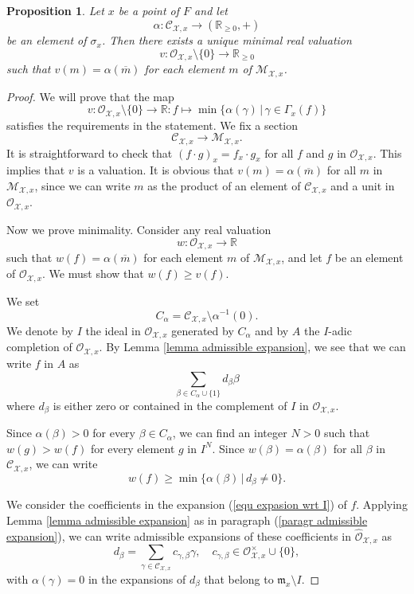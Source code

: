 \documentclass{amsart}%
\numberwithin{equation}{subsection}
\theoremstyle{plain2}
\newtheorem{prop}[equation]{Proposition}
\theoremstyle{definition2}
\theoremstyle{stepstyle}
\theoremstyle{point}
\theoremstyle{subpoint}
\newcommand{\R}{\ensuremath{\mathbb{R}}}
\newcommand{\cX}{\ensuremath{\mathscr{X}}}
\newcommand{\caC}{\ensuremath{\mathcal{C}}}
\newcommand{\caO}{\ensuremath{\mathcal{O}}}
\renewcommand{\R}{\ensuremath{\mathbb{R}}}
\begin{document}
\begin{prop}\label{prop-val}
Let $x$ be a point of $F$ and let
$$\alpha:\mathcal{C}_{\cX,x}\to (\R_{\geq 0},+)$$ be an element of $\sigma_x$.
 Then there exists a unique minimal real valuation
 $$v:\mathcal{O}_{\cX,x} \setminus \{0\}\to \R_{\geq 0}$$ such that
  $v(m)=\alpha(\overline{m})$ for each element $m$ of
 $\mathcal{M}_{\cX,x}$.
 \end{prop}
 \begin{proof}
 We will prove that the map
\begin{equation}\label{eq:val}
v:\mathcal{O}_{\cX,x} \setminus \{0\}\to \R:f\mapsto
\min\{\alpha(\gamma)\,|\,\gamma\in \Gamma_x(f)\}\end{equation}
satisfies the requirements in the statement.
 We fix a section
 $$\mathcal{C}_{\cX,x}\to \mathcal{M}_{\cX,x}.$$
 It is straightforward to
 check that $(f\cdot g)_x=f_x\cdot g_x$ for all $f$ and $g$ in
 $\mathcal{O}_{\cX,x}$.
 This implies that $v$ is a valuation. It is obvious that
$v(m)=\alpha(\overline{m})$ for all $m$ in $\mathcal{M}_{\cX,x}$,
since we can write $m$ as the product of an element of
$\mathcal{C}_{\cX,x}$ and a unit in $\mathcal{O}_{\cX,x}$.

 Now we prove minimality.
 Consider any real valuation
 $$w:\mathcal{O}_{\cX,x}\to \R$$ such that
  $w(f)=\alpha(\overline{m})$ for each element $m$ of
 $\mathcal{M}_{\cX,x}$, and let $f$ be an element of
 $\mathcal{O}_{\cX,x}$. We must show that $w(f)\geq v(f)$.

We set $$C_{\alpha}=\mathcal{C}_{\cX,x}\setminus \alpha^{-1}(0).$$ We denote by $I$ the ideal in $\mathcal{O}_{\cX,x}$ generated by $C_{\alpha}$ and by $A$ the $I$-adic completion of $\mathcal{O}_{\cX,x}$. By Lemma \ref{lemma admissible expansion}, we see that we can write $f$ in $A$ as \begin{equation} \label{equ expasion wrt I}
\sum_{\beta \in C_{\alpha}\cup\{1\}}d_\beta \beta
\end{equation} where $d_\beta$ is either zero or contained in the complement of $I$ in $\mathcal{O}_{\cX,x}$.

Since $\alpha(\beta)>0$ for every $\beta\in C_{\alpha}$, we can find an integer $N>0$ such that $w(g)>w(f)$ for every element $g$ in  $I^N$. Since $w(\beta)=\alpha(\beta)$ for all $\beta$ in $\mathcal{C}_{\cX,x}$, we can write $$w(f)\geq \min \{\alpha(\beta)\,|\,d_\beta \neq 0\}.$$

We consider the coefficients in the expansion (\ref{equ expasion wrt I}) of $f$. Applying Lemma \ref{lemma admissible expansion} as in paragraph (\ref{paragr admissible expansion}), we can write admissible expansions of these coefficients in $\widehat{\mathcal{O}}_{\cX,x}$ as $$d_\beta = \sum_{\gamma \in \caC_{\cX,x}}c_{\gamma, \beta} \gamma, \quad c_{\gamma, \beta} \in \caO_{\cX,x}^\times \cup \{0\},$$ with $\alpha(\gamma)=0$ in the expansions of $d_\beta$ that belong to $\mathfrak{m}_x \setminus I$. 


\end{proof}
\end{document}
